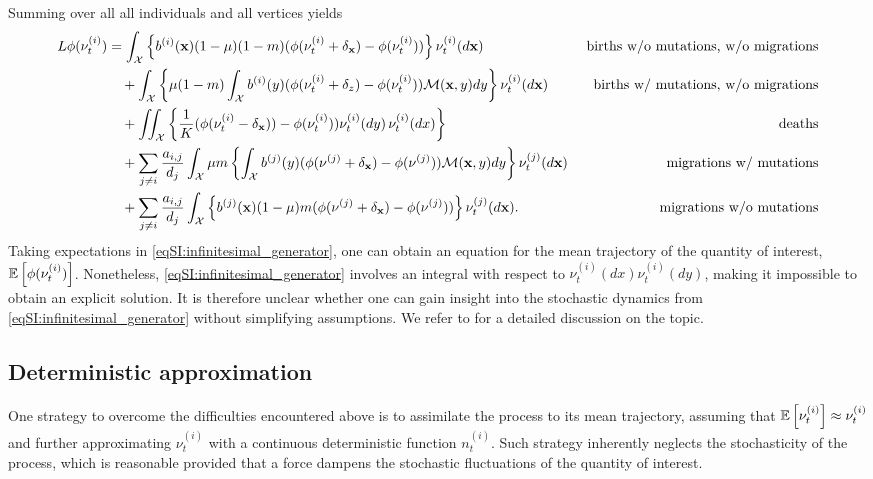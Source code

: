     Summing over all all individuals and all vertices yields
    \small
    \begin{align} \label{eqSI:infinitesimal_generator}
        L\phi(\nu^{(i)}_t) &= \int_\mathcal{X} \left\{ b^{(i)}({\textbf x}) (1 - \mu ) (1 - m)( \phi(\nu^{(i)}_t + \delta_{{\textbf x}}) - \phi(\nu^{(i)}_t))\right\} \nu^{(i)}_t(d{\textbf x}) &\text{ births w/o mutations, w/o migrations} \nonumber\\
        &\quad + \int_\mathcal{X}  \left\{\mu (1-m) \int_\mathcal{X} b^{(i)}(y) (\phi(\nu^{(i)}_t + \delta_z) - \phi(\nu^{(i)}_t))\mathcal{M}({\textbf x},y) dy \right\} \nu^{(i)}_t(d{\textbf x})  &\text{ births w/ mutations, w/o migrations} \nonumber\\
        &\quad + \iint_\mathcal{X} \left\{ \frac{1}{K}(\phi(\nu^{(i)}_t - \delta_{{\textbf x}})) - \phi(\nu^{(i)}_t))\nu^{(i)}_t(d y) \, \nu^{(i)}_t(dx)  \right\} &\text{ deaths} \nonumber\\
        &\quad + \sum_{j \neq i } \frac{a_{i,j}}{d_j} \int_\mathcal{X}  \mu m \left\{ \int_\mathcal{X} b^{(j)}(y) (\phi(\nu^{(j)} +  \delta_{\textbf x}) - \phi(\nu^{(j)}))\mathcal{M}({\textbf x}, y)dy \right\} \nu^{(j)}_t(d{\textbf x})  &\text{ migrations w/ mutations} \nonumber\\
        &\quad + \sum_{j\neq i}\frac{a_{i,j}}{d_j} \int_\mathcal{X} \left\{ b^{(j)}({\textbf x}) (1 - \mu ) m ( \phi(\nu^{(j)} + \delta_{{\textbf x}}) - \phi(\nu^{(j)})) \right\} \nu^{(j)}_t(d{\textbf x}). &\text{ migrations w/o mutations} 
    \end{align}
    \normalsize
    Taking expectations in \cref{eqSI:infinitesimal_generator}, one can obtain an equation for the mean trajectory of the quantity of interest, $ {\mathbb{E}} \left[ \phi(\nu^{(i)}_t) \right]$. Nonetheless, \cref{eqSI:infinitesimal_generator} involves an integral with respect to $\nu^{(i)}_t(dx) \nu^{(i)}_t(dy)$, making it impossible to obtain an explicit solution. It is therefore unclear whether one can gain insight into the stochastic dynamics from \cref{eqSI:infinitesimal_generator} without simplifying assumptions. We refer to \citep{Champagnat2006} for a detailed discussion on the topic.
    
    \subsection{Deterministic approximation} 
    One strategy to overcome the difficulties encountered above is to assimilate the process to its mean trajectory, assuming that ${\mathbb{E}} \left[ \nu^{(i)}_t \right] \approx \nu^{(i)}_t$ and further approximating $\nu^{(i)}_t$ with a continuous deterministic function $n_t^{(i)}$. Such strategy inherently neglects the stochasticity of the process, which is reasonable provided that a force dampens the stochastic fluctuations of the quantity of interest.
    

